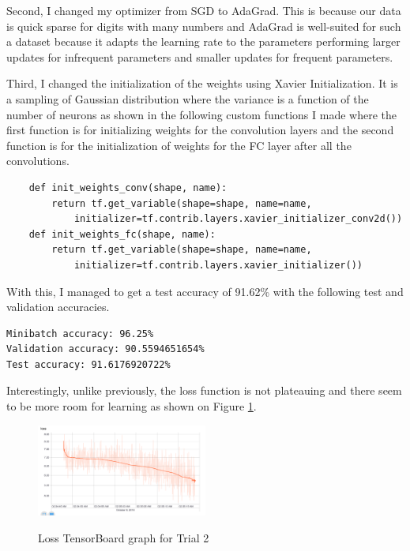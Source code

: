 \documentclass[twoside, column]{article}
\begin{document}
Second, I changed my optimizer from SGD to AdaGrad. This is because our data is quick sparse for digits with many numbers and AdaGrad is well-suited for such a dataset because it adapts the learning rate to the parameters performing larger updates for infrequent parameters and smaller updates for frequent parameters.

Third, I changed the initialization of the weights using Xavier Initialization. It is a sampling of Gaussian distribution where the variance is a function of the number of neurons as shown in the following custom functions I made where the first function is for initializing weights for the convolution layers and the second function is for the initialization of weights for the FC layer after all the convolutions.

\begin{verbatim}
    def init_weights_conv(shape, name):
        return tf.get_variable(shape=shape, name=name,
            initializer=tf.contrib.layers.xavier_initializer_conv2d())
    def init_weights_fc(shape, name):
        return tf.get_variable(shape=shape, name=name,
            initializer=tf.contrib.layers.xavier_initializer())
 \end{verbatim}
 
With this, I managed to get a test accuracy of 91.62\% with the following test and validation accuracies.
\begin{verbatim}
Minibatch accuracy: 96.25%
Validation accuracy: 90.5594651654%
Test accuracy: 91.6176920722%
\end{verbatim}
 
Interestingly, unlike previously, the loss function is not plateauing and there seem to be more room for learning as shown on Figure \ref{trial2loss}.
 
\begin{figure}
\caption{Loss TensorBoard graph for Trial 2}
\centering
\includegraphics[width=0.5\textwidth]{trial_2_loss}
\label{trial2loss}
\end{figure}
\end{document}
